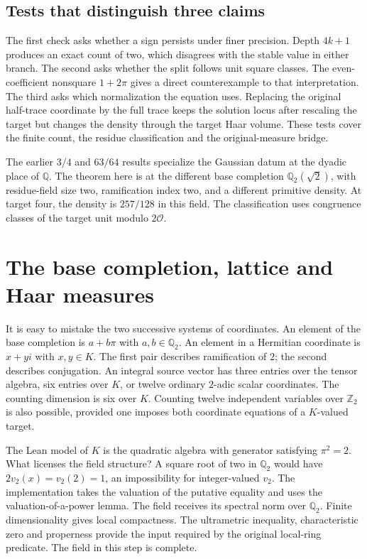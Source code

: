 \documentclass[12pt,letterpaper]{article}
\begin{document}
\subsection{Tests that distinguish three claims}
The first check asks whether a sign persists under finer precision. Depth $4k+1$ produces an exact count of two, which disagrees with the stable value in either branch. The second asks whether the split follows unit square classes. The even-coefficient nonsquare $1+2\pi$ gives a direct counterexample to that interpretation. The third asks which normalization the equation uses. Replacing the original half-trace coordinate by the full trace keeps the solution locus after rescaling the target but changes the density through the target Haar volume. These tests cover the finite count, the residue classification and the original-measure bridge.

The earlier $3/4$ and $63/64$ results specialize the Gaussian datum at the dyadic place of $\mathbb Q$. The theorem here is at the different base completion $\mathbb Q_2(\sqrt2)$, with residue-field size two, ramification index two, and a different primitive density. At target four, the density is $257/128$ in this field. The classification uses congruence classes of the target unit modulo $2\mathcal O$.
\section{The base completion, lattice and Haar measures}
It is easy to mistake the two successive systems of coordinates. An element of the base completion is $a+b\pi$ with $a,b\in\mathbb Q_2$. An element in a Hermitian coordinate is $x+yi$ with $x,y\in K$. The first pair describes ramification of $2$; the second describes conjugation. An integral source vector has three entries over the tensor algebra, six entries over $K$, or twelve ordinary $2$-adic scalar coordinates. The counting dimension is six over $K$. Counting twelve independent variables over $\mathbb Z_2$ is also possible, provided one imposes both coordinate equations of a $K$-valued target.
\par
The Lean model of $K$ is the quadratic algebra with generator satisfying $\pi^2=2$. What licenses the field structure? A square root of two in $\mathbb Q_2$ would have $2v_2(x)=v_2(2)=1$, an impossibility for integer-valued $v_2$. The implementation takes the valuation of the putative equality and uses the valuation-of-a-power lemma. The field receives its spectral norm over $\mathbb Q_2$. Finite dimensionality gives local compactness. The ultrametric inequality, characteristic zero and properness provide the input required by the original local-ring predicate. The field in this step is complete.
\end{document}
